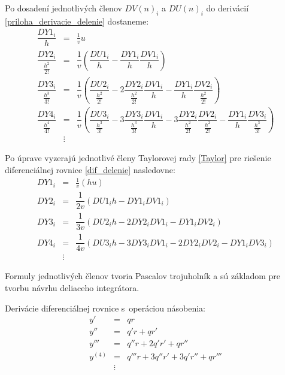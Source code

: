 Po dosadení jednotlivých členov $ DV(n)_{i} $ a $ DU(n)_{i} $ do derivácií \ref{priloha_derivacie_delenie} dostaneme:
\begin{eqnarray}
\dfrac{DY1_{i}}{h} & = & \frac{1}{v} u~\\
\dfrac{DY2_{i}}{\frac{h^{2}}{2!}} & = & \dfrac{1}{v} ( \dfrac{DU1_{i}}{h} - \dfrac{DY1_{i}}{h}\dfrac{DV1_{i}}{h} ) \nonumber \\
\dfrac{DY3_{i}}{\frac{h^{3}}{3!}} & = & \dfrac{1}{v} 
( \dfrac{DU2_{i}}{\frac{h^{2}}{2!}} - 
2\dfrac{DY2_{i}}{\frac{h^{2}}{2!}} \dfrac{DV1_{i}}{h} - 
\dfrac{DY1_{i}}{h} \dfrac{DV2_{i}}{\frac{h^{2}}{2!}} ) \nonumber \\
\dfrac{DY4_{i}}{\frac{h^{4}}{4!}} & = & \dfrac{1}{v} 
( \dfrac{DU3_{i}}{\frac{h^{3}}{3!}} - 
3\dfrac{DY3_{i}}{\frac{h^{3}}{3!}} \dfrac{DV1_{i}}{h} - 
3\dfrac{DY2_{i}}{\frac{h^{2}}{2!}} \dfrac{DV2_{i}}{\frac{h^{2}}{2!}} -
\dfrac{DY1_{i}}{h} \dfrac{DV3_{i}}{\frac{h^{3}}{3!}} ) \nonumber \\
& \vdots \nonumber & 
\end{eqnarray}

Po úprave vyzerajú jednotlivé členy Taylorovej rady \eqref{Taylor} pre riešenie diferenciálnej rovnice \eqref{dif_delenie} nasledovne:
\begin{eqnarray}
DY1_{i} & = & \frac{1}{v} (hu)  \\
DY2_{i} & = & \dfrac{1}{2v} (DU1_{i}h - DY1_{i}DV1_{i}) \\
DY3_{i} & = & \dfrac{1}{3v} ( DU2_{i}h - 2DY2_{i}DV1_{i} - DY1_{i}DV2_{i} ) \\
DY4_{i} & = & \dfrac{1}{4v} ( DU3_{i}h - 3DY3_{i}DV1_{i} - 2DY2_{i}DV2_{i} - DY1_{i}DV3_{i} ) \\ 
& \vdots \nonumber & 
\end{eqnarray}


Formuly jednotlivých členov tvoria Pascalov trojuholník a sú základom pre tvorbu návrhu deliaceho integrátora.



\newpage

Derivácie diferenciálnej rovnice s~operáciou násobenia:
\begin{eqnarray}
y' & = & qr \nonumber \\
y'' & = & q'r + qr' \nonumber \\
y''' & = & q''r + 2q'r' + qr'' \nonumber \\
y^{(4)} & = & q'''r + 3q''r'+ 3q'r'' + qr''' \nonumber \\
 & \vdots \nonumber &
\end{eqnarray}

